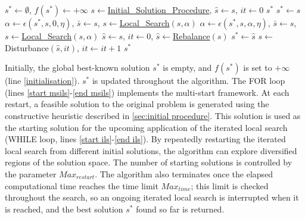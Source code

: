 \documentclass{article}
\begin{document}
\begin{algorithm}[H]
\caption{\textbf{MSILS}}\label{alg:MSILS}
\begin{algorithmic}[1]
\STATE $s^*\gets\emptyset$, $f(s^*)\gets+\infty$ \label{initialisation}
 \label{start msils}
\STATE $s\gets$\hyperref[alg:InitialSchedule]{Initial\_Solution\_Procedure}, $\hat{s}\gets s$, $it\gets0$ \label{initial solution construction}
 \RETURN $s^*$ \ENDIF
{} \STATE $s^*\gets s$ \ENDIF
{} \label{start ils}
\STATE $\alpha\gets\epsilon(s^*,s,0,\eta)$, $\bar{s}\gets s$, $s\gets$\hyperref[alg:LocalSearch]{Local\_Search}$(s,\alpha)$ \label{LS:initialise alpha}
 \label{search: repeat}
    \STATE $\alpha\gets\epsilon(s^*,s,\alpha,\eta)$, $\bar{s}\gets s$, $s\gets$\hyperref[alg:LocalSearch]{Local\_Search}$(s,\alpha)$ \label{LS:update alpha}
\ENDWHILE \label{search: until}
    \STATE $\hat{s}\gets s$, $it\gets0$, $\hat{s}\gets$\hyperref[alg:rebalance]{Rebalance}$(\hat{s})$ \label{run rebalance}
\ENDIF
{} \STATE $s^*\gets\hat{s}$ \ENDIF
\STATE $s\gets$ Disturbance$(\hat{s},it)$, $it\gets it+1$ \label{disturb}
\ENDWHILE \label{end ils}
\ENDFOR \label{end msils}
\RETURN $s^*$
\end{algorithmic}
\end{algorithm}

Initially, the global best-known solution $s^*$ is empty, and $f(s^*)$ is set to $+\infty$ (line \ref{initialisation}). $s^*$ is updated throughout the algorithm. The FOR loop (lines \ref{start msils}-\ref{end msils}) implements the multi-start framework. At each restart, a feasible solution to the original problem is generated using the constructive heuristic described in \ref{sec:initial procedure}. This solution is used as the starting solution for the upcoming application of the iterated local search (WHILE loop, lines \ref{start ils}-\ref{end ils}). By repeatedly restarting the iterated local search from different initial solutions, the algorithm can explore diversified regions of the solution space. The number of starting solutions is controlled by the parameter $Max_{restart}$. The algorithm also terminates once the elapsed computational time reaches the time limit $Max_{time}$; this limit is checked throughout the search, so an ongoing iterated local search is interrupted when it is reached, and the best solution $s^*$ found so far is returned.
\end{document}
